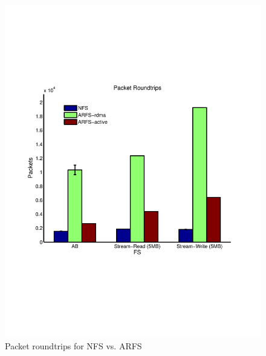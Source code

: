 \documentclass[10pt]{article}
\begin{document}
\begin{figure}
  \centering
\includegraphics[scale=0.5, trim = 0 200 0 200]{../../results/matlab/rt.pdf}
  \caption{Packet roundtrips for NFS vs. ARFS}\label{rt}
\end{figure}
\end{document}
